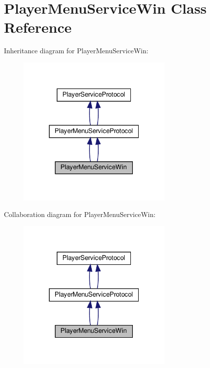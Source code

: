 \hypertarget{classPlayerMenuServiceWin}{}\section{Player\+Menu\+Service\+Win Class Reference}
\label{classPlayerMenuServiceWin}


Inheritance diagram for Player\+Menu\+Service\+Win\+:
\nopagebreak
\begin{figure}[H]
\begin{center}
\leavevmode
\includegraphics[width=217pt]{classPlayerMenuServiceWin__inherit__graph}
\end{center}
\end{figure}


Collaboration diagram for Player\+Menu\+Service\+Win\+:
\nopagebreak
\begin{figure}[H]
\begin{center}
\leavevmode
\includegraphics[width=217pt]{classPlayerMenuServiceWin__coll__graph}
\end{center}
\end{figure}
